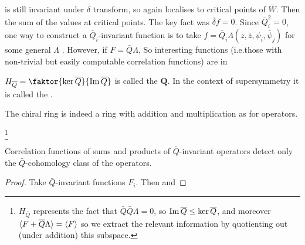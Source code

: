 \documentclass{article}
\begin{document}
is still invariant under $\bar{\delta}$ transform, so again localises to critical points of $\bar{W}$. Then 
the sum of the values at critical points. The key fact was $\bar{\delta}f=0$. Since $\bar{Q}_i^2=0$, one way to construct a $\bar{Q}_i$-invariant function is to take $f=\bar{Q}_i \Lambda(z,\bar{z},\psi_i,\bar{\psi}_j)$ for some general $\Lambda$ . However, if $F=\bar{Q}\Lambda$, 
So interesting functions (i.e.those with non-trivial but easily computable correlation functions) are in 
\begin{definition}
	$H_{\bar{Q}} = \faktor{\ker \bar{Q}}{\image \bar{Q}}$ is called the $\bm{\bar{Q}}$. In the context of supersymmetry it is called the .
\end{definition}
\begin{prop}
	The chiral ring is indeed a ring with addition and multiplication as for operators. 
\end{prop}

\footnote{$H_{\bar{Q}}$ represents the fact that $\bar{Q}\bar{Q}\Lambda = 0$, so $\operatorname{Im} \overline{Q} \leq \ker \overline{Q}$, and moreover $\braket{F + \overline{Q} \Lambda} =  \braket{F}$ so we extract the relevant information by quotienting out (under addition) this subspace.} 
\begin{prop}
	Correlation functions of sums and products of $\bar{Q}$-invariant operators detect only the $\bar{Q}$-cohomology class of the operators.
\end{prop}
\begin{proof}
	Take $\bar{Q}$-invariant functions $F_i$. Then
and 

\end{proof} 
\end{document}
